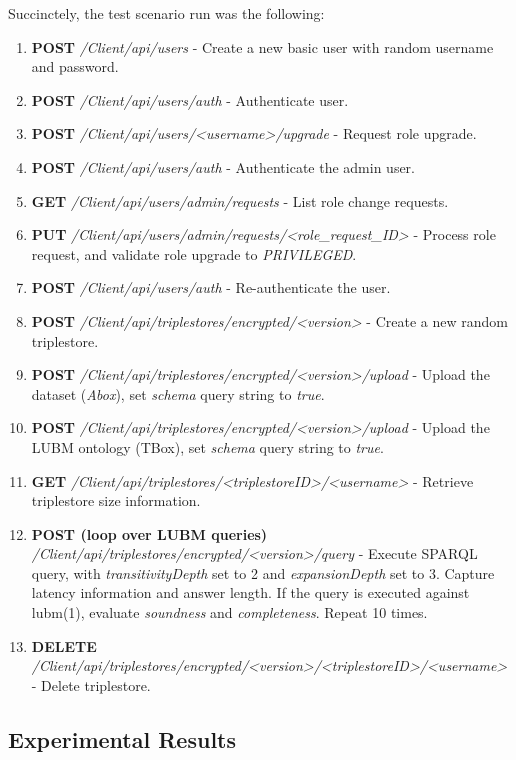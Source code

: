 Succinctely, the test scenario run was the following:

\begin{enumerate}
  \item \textbf{POST} \emph{/Client/api/users} - Create a new basic user with random username and password.
  \item \textbf{POST} \emph{/Client/api/users/auth} - Authenticate user.
  \item \textbf{POST} \emph{/Client/api/users/<username>/upgrade} - Request role upgrade.
  \item \textbf{POST} \emph{/Client/api/users/auth} - Authenticate the admin user.
  \item \textbf{GET} \emph{/Client/api/users/admin/requests} - List role change requests.
  \item \textbf{PUT} \emph{/Client/api/users/admin/requests/<role\_request\_ID>} - Process role request, and validate role upgrade to \emph{PRIVILEGED}.
  \item \textbf{POST} \emph{/Client/api/users/auth} - Re-authenticate the user.
  \item \textbf{POST} \emph{/Client/api/triplestores/encrypted/<version>} - Create a new random triplestore.
  \item \textbf{POST} \emph{/Client/api/triplestores/encrypted/<version>/upload} - Upload the dataset (\emph{Abox}), set \emph{schema} query string to \emph{true}.
  \item \textbf{POST} \emph{/Client/api/triplestores/encrypted/<version>/upload} - Upload the \gls{LUBM} ontology (TBox), set \emph{schema} query string to \emph{true}.
  \item \textbf{GET} \emph{/Client/api/triplestores/<triplestoreID>/<username>} - Retrieve triplestore size information.
  \item \textbf{POST (loop over \gls{LUBM} queries)} \emph{/Client/api/triplestores/encrypted/<version>/query} - Execute \gls{SPARQL} query, with \emph{transitivityDepth} set to 2 and \emph{expansionDepth} set to 3. Capture latency information and answer length. If the query is executed against lubm(1), evaluate \emph{soundness} and \emph{completeness}. Repeat 10 times.
  \item \textbf{DELETE} \emph{/Client/api/triplestores/encrypted/<version>/<triplestoreID>/<username>} - Delete triplestore.
\end{enumerate}

\subsection{Experimental Results}

